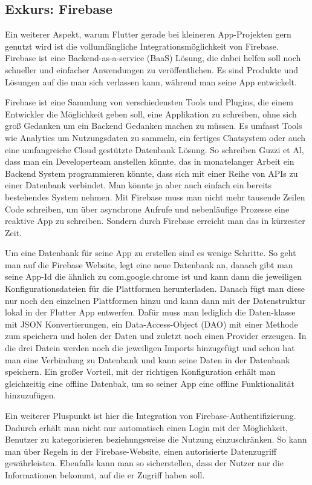 \subsection{Exkurs: Firebase}
Ein weiterer Aspekt, warum Flutter gerade bei kleineren App-Projekten gern genutzt wird ist die vollumfängliche Integrationsmöglichkeit von Firebase. Firebase ist eine Backend-as-a-service (BaaS) Lösung, die dabei helfen soll noch schneller und einfacher Anwendungen zu veröffentlichen. Es sind Produkte und Lösungen auf die man sich verlassen kann, während man seine App entwickelt.\cite{firebase_documentation}

Firebase ist eine Sammlung von verschiedensten Tools und Plugins, die einem Entwickler die Möglichkeit geben soll, eine Applikation zu schreiben, ohne sich groß Gedanken um ein Backend Gedanken machen zu müssen. Es umfasst Tools wie Analytics um Nutzungsdaten zu sammeln, ein fertiges Chatsystem oder auch eine umfangreiche Cloud gestützte Datenbank Lösung. So schreiben Guzzi et Al, dass man ein Developerteam anstellen könnte, das in monatelanger Arbeit ein Backend System programmieren könnte, dass sich mit einer Reihe von APIs zu einer Datenbank verbindet. Man könnte ja aber auch einfach ein bereits bestehendes System nehmen. Mit Firebase muss man nicht mehr tausende Zeilen Code schreiben, um über asynchrone Aufrufe und nebenläufige Prozesse eine reaktive App zu schreiben. Sondern durch Firebase erreicht man das in kürzester Zeit.\cite[p.~608]{Flutter_Apprentice}

Um eine Datenbank für seine App zu erstellen sind es wenige Schritte. So geht man auf die Firebase Website, legt eine neue Datenbank an, danach gibt man seine App-Id die ähnlich zu com.google.chrome ist und kann dann die jeweiligen Konfigurationsdateien für die Plattformen herunterladen. Danach fügt man diese nur noch den einzelnen Plattformen hinzu und kann dann mit der Datenstruktur lokal in der Flutter App entwerfen. Dafür muss man lediglich die Daten-klasse mit JSON Konvertierungen, ein Data-Access-Object (DAO) mit einer Methode zum speichern und holen der Daten und zuletzt noch einen Provider erzeugen. In die drei Datein werden noch die jeweiligen Imports hinzugefügt und schon hat man eine Verbindung zu Datenbank und kann seine Daten in der Datenbank speichern. Ein großer Vorteil, mit der richtigen Konfiguration erhält man gleichzeitig eine offline Datenbak, um so seiner App eine offline Funktionalität hinzuzufügen.\cite{Flutter_Apprentice}

Ein weiterer Pluspunkt ist hier die Integration von Firebase-Authentifizierung. Dadurch erhält man nicht nur automatisch einen Login mit der Möglichkeit, Benutzer zu kategorisieren beziehungsweise die Nutzung einzuschränken. So kann man über Regeln in der Firebase-Website, einen autorisierte Datenzugriff gewährleisten. Ebenfalls kann man so sicherstellen, dass der Nutzer nur die Informationen bekommt, auf die er Zugriff haben soll.\cite{Flutter_Apprentice}


